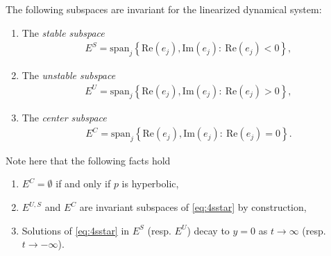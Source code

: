 \begin{definition}
The following subspaces are invariant for the linearized dynamical system:
\begin{enumerate}
	\item The \emph{stable subspace}
		\begin{align}
			\boxed{
				E^{S} =  \textrm{span} _{j}\left \{  \textrm{Re} (e_j),  \textrm{Im} (e_j):\  \textrm{Re} (e_j) < 0\right\},
			}
		\end{align}
	\item The \emph{unstable subspace}
		\begin{align}
			\boxed{
				E^{U} =  \textrm{span} _{j}\left \{  \textrm{Re} (e_j),  \textrm{Im} (e_j):\  \textrm{Re} (e_j) > 0\right\},
			}
		\end{align}
	\item The \emph{center subspace}
		\begin{align}
			\boxed{
				E^{C} =  \textrm{span} _{j}\left \{  \textrm{Re} (e_j),  \textrm{Im} (e_j):\  \textrm{Re} (e_j) = 0\right\}.
			}
		\end{align}
\end{enumerate}

\end{definition}
\begin{remark}[]
	Note here that the following facts hold
	\begin{enumerate}
		\item $E^{C}= \emptyset$ if and only if $p$ is hyperbolic,
		\item $E^{U,S}$ and $E^{C}$ are invariant subspaces of \eqref{eq:4sstar} by construction,
		\item Solutions of \eqref{eq:4sstar} in $E^{S}$ (resp. $E^{U}$) decay to $y=0$ as $t \to \infty$ (resp. $t \to - \infty$). 
	\end{enumerate}
	
\end{remark}

